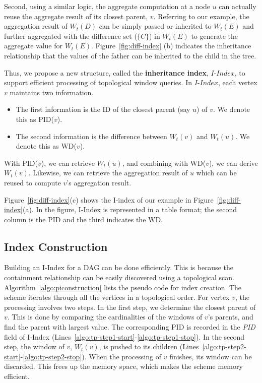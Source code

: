 Second, using a similar logic, the aggregate computation
at a node $u$ can actually reuse the 
aggregate result of its closest parent, $v$.
Referring to our example, the aggregation result of $W_t(D)$ can be 
simply passed or inherited to $W_t(E)$ and further aggregated with the difference 
set ($\{C\}$) in $W_t(E)$ to generate the aggregate value for $W_t(E)$. 
Figure~\ref{fig:diff-index} (b) indicates the inheritance relationship that 
the values of the father can be inherited to the child in the tree. 

Thus, we propose a new structure, called the \textbf{inheritance index}, 
$I$-$Index$, to support efficient processing of topological window queries. 
In $I$-$Index$, each vertex $v$ maintains two information. 
\begin{itemize}
\item The first information is the ID of the closest parent (say $u$) 
of $v$. We denote this as PID($v$).
\item The second information is the difference between 
$W_t(v)$ and $W_t(u)$. We denote this as WD($v$). 
\end{itemize}

With PID($v$), we can retrieve $W_t(u)$, and combining with 
WD($v$), we can derive $W_t(v)$. 
Likewise, we can retrieve the aggregation result of $u$ 
which can be reused to compute $v$'s aggregation result.

Figure~\ref{fig:diff-index}(c) shows the I-index of our example
in Figure~\ref{fig:diff-index}(a). In the figure, I-Index
is represented in a table format; 
the second column is the PID and the third indicates the WD. 

\subsection{Index Construction} 

Building an I-Index for a DAG
can be done efficiently. 
This is because the containment relationship can be easily 
discovered using a topological scan.
Algorithm~\ref{algo:piconstruction} lists the pseudo code for 
index creation. 
The scheme iterates through all the vertices in a topological order.
For vertex $v$, the processing involves two steps.
In the first step, we determine the closest parent
of $v$. This is done by comparing the cardinalities of 
the windows of $v$'s parents, and 
find the parent with largest value. 
The corresponding PID is recorded in the \emph{PID} field of 
I-Index (Lines~\ref{algo:tp-step1-start}-\ref{algo:tp-step1-stop}). 
In the second step, the window of $v$, $W_t(v)$, is pushed to 
its children 
(Lines~\ref{algo:tp-step2-start}-\ref{algo:tp-step2-stop}). 
When the processing of $v$ finishes, its window can be discarded. This
frees up the memory space, which makes the scheme memory efficient.

